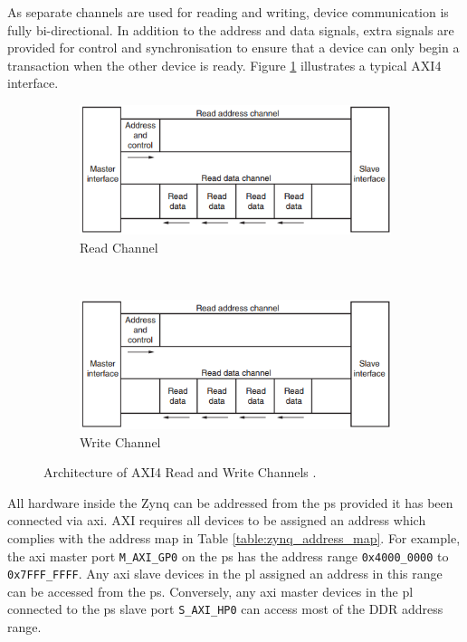 As separate channels are used for reading and writing, device communication is fully bi-directional. In addition to the address and data signals, extra signals are provided for control and synchronisation to ensure that a device can only begin a transaction when the other device is ready. Figure \ref{fig:axi_architecture} illustrates a typical AXI4 interface. 

\begin{figure}[t!]
  \centering
  \begin{subfigure}[t]{0.5\textwidth}
    \centering
    \includegraphics[width=1\textwidth]{./img/axi_read.png}
    \caption{Read Channel}
  \end{subfigure}%
  ~ 
  \begin{subfigure}[t]{0.5\textwidth}
    \centering
    \includegraphics[width=1\textwidth]{./img/axi_read.png}
    \caption{Write Channel}
  \end{subfigure}
  \caption{Architecture of AXI4 Read and Write Channels \cite{xilinx:ug1037}.}
  \label{fig:axi_architecture}
\end{figure}

All hardware inside the Zynq can be addressed from the \gls{ps} provided it has been connected via \gls{axi}. AXI requires all devices to be assigned an address which complies with the address map in Table \ref{table:zynq_address_map}. For example, the \gls{axi} master port \texttt{M\_AXI\_GP0} on the \gls{ps} has the address range \texttt{0x4000\_0000} to \texttt{0x7FFF\_FFFF}. Any \gls{axi} slave devices in the \gls{pl} assigned an address in this range can be accessed from the \gls{ps}. Conversely, any \gls{axi} master devices in the \gls{pl} connected to the \gls{ps} slave port \texttt{S\_AXI\_HP0} can access most of the DDR address range.

